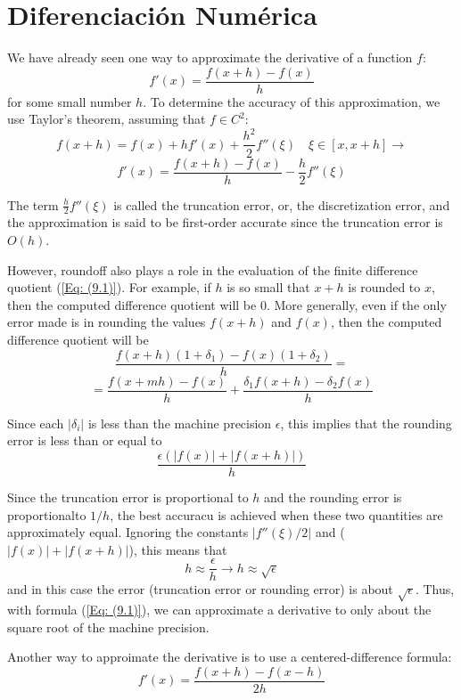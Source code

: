 \chapter{Diferenciación Numérica}
We have already seen one way to approximate the derivative of a function $f$:
\begin{equation}
    f'(x) = \frac{f(x + h) - f(x)}{h}
    \label{Eq: (9.1)}
\end{equation}
for some small number $h$. To determine the accuracy of this approximation, we use Taylor's theorem, assuming that $f \in C^2$: 
\[ f(x + h) = f(x) + h f'(x) + \frac{h^2}{2} f''(\xi) \quad \xi \in [x, x+h] \rightarrow \]
\[ f'(x) = \frac{f(x + h) - f(x)}{h} - \frac{h}{2} f''(\xi)\]

The term $\frac{h}{2} f''(\xi)$ is called the truncation error, or, the discretization error, and the approximation is said to be first-order accurate since the truncation error is $O(h)$.

However, roundoff also plays a role in the evaluation of the finite difference quotient (\ref{Eq: (9.1)}). For example, if $h$ is so small that $x + h$ is rounded to $x$, then the computed difference quotient will be 0. More generally, even if the only error made is in rounding the values $f(x + h)$ and $f(x)$, then the computed difference quotient will be
\[ \frac{f(x + h) (1 + \delta_1) - f(x) (1 + \delta_2)}{h} = \]
\[ = \frac{f(x + mh) - f(x)}{h} + \frac{\delta_1 f(x + h) - \delta_2 f(x)}{h}\]

Since each $|\delta_i|$ is less than the machine precision $\epsilon$, this implies that the rounding error is less than or equal to 
\[ \frac{\epsilon(|f(x)| + |f(x + h)|)}{h} \] 

Since the truncation error is proportional to $h$ and the rounding error is proportionalto $1/h$, the best accuracu is achieved when these two quantities are approximately equal. Ignoring the constants $|f''(\xi)/2|$ and ($|f(x)| + |f(x + h)|$), this means that
\[h \approx \frac{\epsilon}{h} \rightarrow h \approx \sqrt{\epsilon}\]
and in this case the error (truncation error or rounding error) is about $\sqrt{\epsilon}$. Thus, with formula (\ref{Eq: (9.1)}), we can approximate a derivative to only about the square root of the machine precision.

Another way to approimate the derivative is to use a centered-difference formula:
\begin{equation}
    f'(x) = \frac{f(x + h) - f(x - h)}{2h}
    \label{Eq: (9.2)}
\end{equation}

